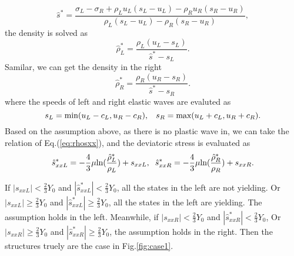 \documentclass{article}
\theoremstyle{plain}\newtheorem{definition}{\sc{Definition}}
\theoremstyle{defination}\newtheorem{example}{Example}[section]
\numberwithin{equation}{section}
\numberwithin{table}{section}
\begin{document}
\begin{equation}
 \hat{s}^* = \frac{\sigma_L-\sigma_R+\rho_L u_L(s_L-u_L)-\rho_R u_R(s_R-u_R)}{\rho_L(s_L-u_L)-\rho_R(s_R-u_R)},
\end{equation}
the density is solved as
\begin{equation}\label{eq:rhoLs}
  \hat{\rho}_L^* = \frac{\rho_L(u_L-s_L)}{\hat{s}^*-s_L}.
\end{equation}
Samilar, we can get the density in the right 
\begin{equation}\label{eq:rhoLs}
  \hat{\rho}_R^* = \frac{\rho_R(u_R-s_R)}{\hat{s}^*-s_R}.
\end{equation}
where the speeds of left and right elastic waves are evaluted as 
	\begin{equation}\label{eq:sLR}
	  s_L = \text{min} (u_L-c_L, u_R-c_R), \hspace{0.3cm} s_R = \text{max}(u_L+c_L, u_R+c_R).
	\end{equation}
Based on the assumption above, as there is no plastic wave in, we can take the relation of Eq.(\ref{eq:rhosxx}), and the deviatoric stress is evaluated as 
\begin{equation}
  \hat{s}_{xxL}^*=-\frac{4}{3}\mu\text{ln}(\frac{\hat{\rho}_L^*}{\rho_L})+s_{xxL},\hspace{0.2cm}  \hat{s}_{xxR}^*=-\frac{4}{3}\mu\text{ln}(\frac{\hat{\rho}_R^*}{\rho_R})+s_{xxR}.
\end{equation}

If $|s_{xxL}|<\frac{2}{3}Y_0$ and $|\hat{s}_{xxL}^*| < \frac{2}{3}Y_0$, all the states in the left are not yielding. Or  $|s_{xxL}| \ge \frac{2}{3}Y_0$ and $|\hat{s}_{xxL}^*| \ge  \frac{2}{3}Y_0$, all the states in the left are yielding. The assumption  holds in the left. 
Meanwhile, if $|s_{xxR}|<\frac{2}{3}Y_0$ and $|\hat{s}_{xxR}^*| < \frac{2}{3}Y_0$, Or $|s_{xxR}| \ge \frac{2}{3}Y_0$ and $|\hat{s}_{xxR}^*| \ge  \frac{2}{3}Y_0$, the assumption holds in the right. Then the structures  truely are  the case in Fig.\ref{fig:case1}. 
\end{document}
